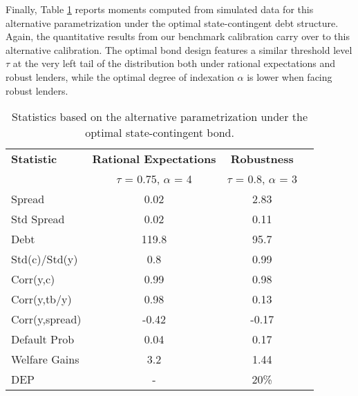 Finally, Table \ref{table:CE2} reports moments computed from simulated data for this alternative parametrization under the optimal state-contingent debt structure. Again, the quantitative results from our benchmark calibration carry over to this alternative calibration. The optimal bond design features a similar threshold level $\tau$ at the very left tail of the distribution both under rational expectations and robust lenders, while the optimal degree of indexation $\alpha$ is lower when facing robust lenders.

\begin{table}[!hbtp]\centering\small 
\caption{Statistics based on the alternative parametrization under the optimal state-contingent bond.} \label{table:CE2}
\begin{tabular}{@{}lccc@{}}\toprule
\textbf{Statistic} & \textbf{Rational Expectations} & \textbf{Robustness}\\
& $\tau$ = 0.75, $\alpha$ = 4 & $\tau$ = 0.8, $\alpha$ = 3 &\\\midrule
Spread                   &   0.02          & 2.83                        \\
Std Spread               &   0.02          & 0.11                     \\
Debt                     &    119.8        & 95.7                 \\
Std(c)/Std(y)            &     0.8        & 0.99                   \\
Corr(y,c)                &     0.99       & 0.98                   \\
Corr(y,tb/y)             &     0.98      & 0.13                  \\
Corr(y,spread)           &   -0.42         & -0.17                      \\
Default Prob             &  0.04           & 0.17                      \\
Welfare Gains            & 3.2             & 1.44                    \\
DEP                         & -               &   20\%                      \\
  \bottomrule
\end{tabular}%

\end{table}



